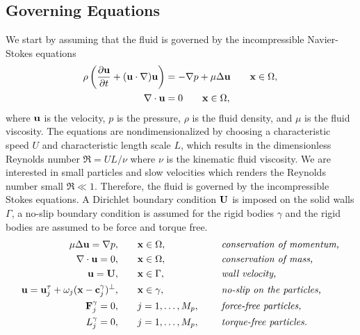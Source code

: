 \documentclass[preprint, 10pt]{elsarticle}
\begin{document}
\subsection{Governing Equations}\label{sec:governing}
We start by assuming that the fluid is governed by the incompressible
Navier-Stokes equations 
\begin{align*}
  \rho\left(\frac{\partial {\mathbf{u}}}{\partial t} + ({\mathbf{u}} \cdot {\nabla}) {\mathbf{u}} \right) &= 
    -{\nabla} p + \mu \Delta {\mathbf{u}} \qquad {\mathbf{x}}\in\Omega,\\
    {\nabla} \cdot {\mathbf{u}} &= 0 \qquad {\mathbf{x}}\in\Omega,
\end{align*}
where ${\mathbf{u}}$ is the velocity, $p$ is the pressure, $\rho$ is the fluid
density, and $\mu$ is the fluid viscosity.  The equations are
nondimensionalized by choosing a characteristic speed $U$ and
characteristic length scale $L$, which results in the dimensionless
Reynolds number $\Re = UL/\nu$ where $\nu$ is the kinematic fluid
viscosity.  We are interested in small particles and slow velocities
which renders the Reynolds number small $\Re \ll 1$.  Therefore, the
fluid is governed by the incompressible Stokes equations.  A Dirichlet
boundary condition ${\mathbf{U}}$ is imposed on the solid walls $\Gamma$, a
no-slip boundary condition is assumed for the rigid bodies $\gamma$ and 
the rigid bodies are assumed to be force and torque free.
\begin{equation}
  \label{eqn:modelEquations}
  \begin{split}
  \mu \Delta {\mathbf{u}} = {\nabla} p, &\hspace{20pt} {\mathbf{x}} \in \Omega, \hspace*{.2in}
    &&\mbox{\em conservation of momentum,}\\
  {\nabla} \cdot {\mathbf{u}} = 0, &\hspace{20pt} {\mathbf{x}} \in \Omega, \hspace*{.2in}
    &&\mbox{\em conservation of mass,} \\
  {\mathbf{u}} = {\mathbf{U}}, &\hspace{20pt} {\mathbf{x}} \in \Gamma, \hspace*{.2in} 
    &&\mbox{\em wall velocity,} \\
  {\mathbf{u}} = {\mathbf{u}}^\tau_j + \omega_j({\mathbf{x}}-{\mathbf{c}}^\gamma_j)^\perp,&\hspace{20pt} 
    {\mathbf{x}} \in \gamma, \hspace*{.2in} &&\mbox{\em no-slip on the particles,} \\
  {\mathbf{F}}_j^\gamma = 0, &\hspace{20pt}j=1,\ldots,M_p, \hspace*{.2in} 
    &&\mbox{\em force-free particles,} \\
  L_j^\gamma = 0, &\hspace{20pt}j=1,\ldots,M_p, \hspace*{.2in} 
    &&\mbox{\em torque-free particles.}
  \end{split}
\end{equation}
\end{document}
